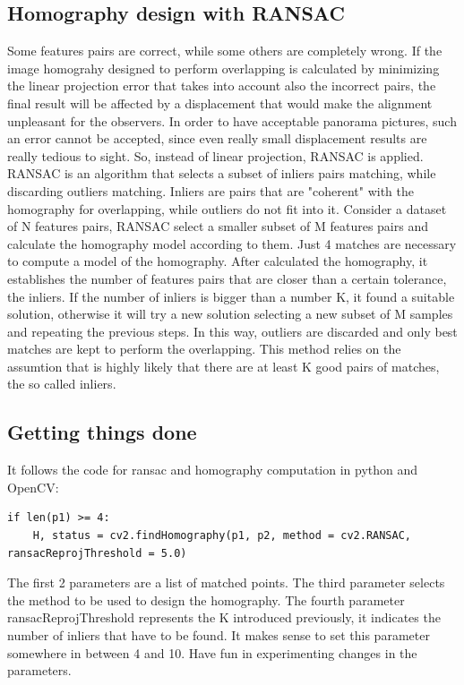 \documentclass[aps,letterpaper,10pt]{revtex4}
\begin{document}
\subsection{Homography design with RANSAC}
Some features pairs are correct, while some others are completely wrong. If the image homograhy designed to perform overlapping is calculated by minimizing the linear projection error that takes into account also the incorrect pairs, the final result will be affected by a displacement that would make the alignment unpleasant for the observers. In order to have acceptable panorama pictures, such an error cannot be accepted, since even really small displacement results are really tedious to sight. So, instead of linear projection, RANSAC is applied. RANSAC is an algorithm that selects a subset of inliers pairs matching, while discarding outliers matching. Inliers are pairs that are "coherent" with the homography for overlapping, while outliers do not fit into it. Consider a dataset of N features pairs, RANSAC select a smaller subset of M features pairs and calculate the homography model according to them. Just 4 matches are necessary to compute a model of the homography. After calculated the homography, it establishes the number of features pairs that are closer than a certain tolerance, the inliers. If the number of inliers is bigger than a number K, it found a suitable solution, otherwise it will try a new solution selecting a new subset of M samples and repeating the previous steps. In this way, outliers are discarded and only best matches are kept to perform the overlapping. This method relies on the assumtion that is highly likely that there are at least K good pairs of matches, the so called inliers. 
\subsection{Getting things done}
It follows the code for ransac and homography computation in python and OpenCV:
\begin{lstlisting}
if len(p1) >= 4:
	H, status = cv2.findHomography(p1, p2, method = cv2.RANSAC, ransacReprojThreshold = 5.0)
\end{lstlisting}
The first 2 parameters are a list of matched points. The third parameter selects the method to be used to design the homography. The fourth parameter ransacReprojThreshold represents the K introduced previously, it indicates the number of inliers that have to be found. It makes sense to set this parameter somewhere in between 4 and 10. Have fun in experimenting changes in the parameters.
\end{document}
